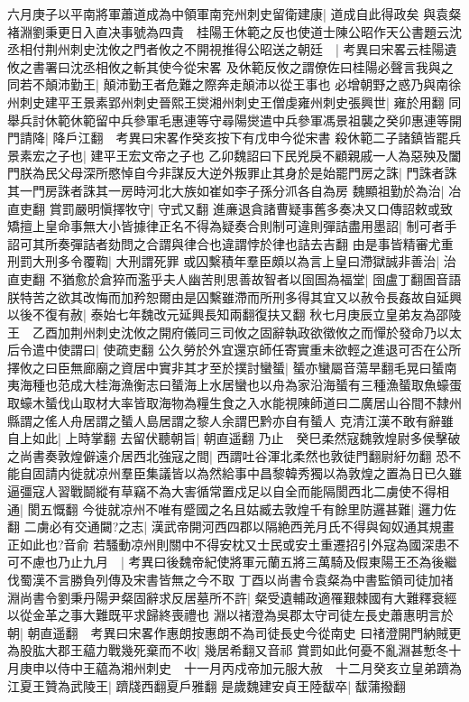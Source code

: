 六月庚子以平南將軍蕭道成為中領軍南兖州刺史留衛建康|{
	道成自此得政矣}
與袁粲褚淵劉秉更日入直决事號為四貴　桂陽王休範之反也使道士陳公昭作天公書題云沈丞相付荆州刺史沈攸之門者攸之不開視推得公昭送之朝廷　|{
	考異曰宋畧云桂陽遺攸之書署曰沈丞相攸之斬其使今從宋畧}
及休範反攸之謂僚佐曰桂陽必聲言我與之同若不顛沛勤王|{
	顛沛勤王者危難之際奔走顛沛以從王事也}
必增朝野之惑乃與南徐州刺史建平王景素郢州刺史晉熙王爕湘州刺史王僧虔雍州刺史張興世|{
	雍於用翻}
同舉兵討休範休範留中兵參軍毛惠連等守尋陽爕遣中兵參軍馮景祖襲之癸卯惠連等開門請降|{
	降戶江翻　考異曰宋畧作癸亥按下有戊申今從宋書}
殺休範二子諸鎮皆罷兵景素宏之子也|{
	建平王宏文帝之子也}
乙卯魏詔曰下民兇戾不顧親戚一人為惡殃及闔門朕為民父母深所愍悼自今非謀反大逆外叛罪止其身於是始罷門房之誅|{
	門誅者誅其一門房誅者誅其一房時河北大族如崔如李子孫分沠各自為房}
魏顯祖勤於為治|{
	冶直吏翻}
賞罰嚴明愼擇牧守|{
	守式又翻}
進亷退貪諸曹疑事舊多奏决又口傳詔敕或致矯擅上皇命事無大小皆據律正名不得為疑奏合則制可違則彈詰盡用墨詔|{
	制可者手詔可其所奏彈詰者劾問之合謂與律合也違謂悖於律也詰去吉翻}
由是事皆精審尤重刑罰大刑多令覆鞫|{
	大刑謂死罪}
或囚繫積年羣臣頗以為言上皇曰滯獄誠非善治|{
	治直吏翻}
不猶愈於倉猝而濫乎夫人幽苦則思善故智者以囹圄為福堂|{
	囹盧丁翻圄音語}
朕特苦之欲其改悔而加矜恕爾由是囚繫雖滯而所刑多得其宜又以赦令長姦故自延興以後不復有赦|{
	泰始七年魏改元延興長知兩翻復扶又翻}
秋七月庚辰立皇弟友為邵陵王　乙酉加荆州刺史沈攸之開府儀同三司攸之固辭執政欲徵攸之而憚於發命乃以太后令遣中使謂曰|{
	使疏吏翻}
公久勞於外宜還京師任寄實重未欲輕之進退可否在公所擇攸之曰臣無廊廟之資居中實非其才至於撲討蠻蜑|{
	蜑亦蠻屬音蕩旱翻毛晃曰蜑南夷海種也范成大桂海漁衡志曰蜑海上水居蠻也以舟為家沿海蜑有三種漁蜑取魚蠔蛋取蠔木蜑伐山取材大率皆取海物為糧生食之入水能視陳師道曰二廣居山谷間不隸州縣謂之傜人舟居謂之蜑人島居謂之黎人余謂巴黔亦自有蜑人}
克清江漢不敢有辭雖自上如此|{
	上時掌翻}
去留伏聽朝旨|{
	朝直遥翻}
乃止　癸巳柔然寇魏敦煌尉多侯擊破之尚書奏敦煌僻遠介居西北強寇之間|{
	西謂吐谷渾北柔然也敦徒門翻尉紆勿翻}
恐不能自固請内徙就凉州羣臣集議皆以為然給事中昌黎韓秀獨以為敦煌之置為日已久雖逼彊寇人習戰鬬縱有草竊不為大害循常置戍足以自全而能隔閡西北二虜使不得相通|{
	閡五慨翻}
今徙就凉州不唯有蹙國之名且姑臧去敦煌千有餘里防邏甚難|{
	邏力佐翻}
二虜必有交通闚?之志|{
	漢武帝開河西四郡以隔絶西羌月氏不得與匈奴通其規畫正如此也?音俞}
若騷動凉州則關中不得安枕又士民或安土重遷招引外寇為國深患不可不慮也乃止九月　|{
	考異曰後魏帝紀使將軍元蘭五將三萬騎及假東陽王丕為後繼伐蜀漢不言勝負列傳及宋書皆無之今不取}
丁酉以尚書令袁粲為中書監領司徒加禇淵尚書令劉秉丹陽尹粲固辭求反居墓所不許|{
	粲受遺輔政適罹艱棘國有大難釋衰經以從金革之事大難既平求歸終喪禮也}
淵以禇澄為吳郡太守司徒左長史蕭惠明言於朝|{
	朝直遥翻　考異曰宋畧作惠朗按惠朗不為司徒長史今從南史}
曰禇澄開門納賊更為股肱大郡王藴力戰幾死棄而不收|{
	幾居希翻又音祁}
賞罰如此何憂不亂淵甚慙冬十月庚申以侍中王藴為湘州刺史　十一月丙戍帝加元服大赦　十二月癸亥立皇弟躋為江夏王贊為武陵王|{
	躋牋西翻夏戶雅翻}
是歲魏建安貞王陸馛卒|{
	馛蒲撥翻}


